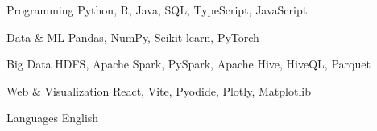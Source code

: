 

\begin{cvskills}

  \cvskill
    {Programming} %
    {Python, R, Java, SQL, TypeScript, JavaScript} %

  \cvskill
    {Data \& ML} %
    {Pandas, NumPy, Scikit-learn, PyTorch} %

  \cvskill
    {Big Data} %
    {HDFS, Apache Spark, PySpark, Apache Hive, HiveQL, Parquet} %

  \cvskill
    {Web \& Visualization} %
    {React, Vite, Pyodide, Plotly, Matplotlib} %

  \cvskill
    {Languages} %
    {English} %

\end{cvskills}
